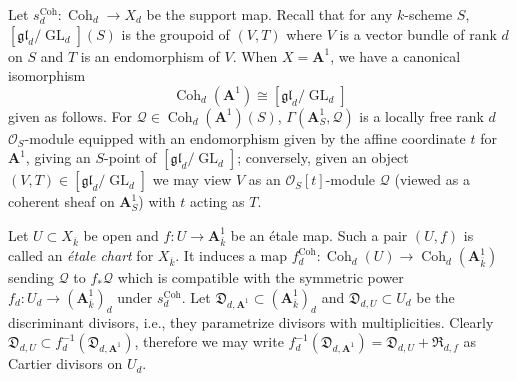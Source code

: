 \documentclass[reqno]{amsart}
\numberwithin{equation}{section}
\newcommand{\A}{\mathbf{A}}
\DeclareMathOperator{\GL}{GL}
\DeclareMathOperator{\Coh}{Coh}
\newcommand{\ov}{\overline}
\newcommand\gl{\mathfrak{gl}}
\newcommand\cO{\mathcal{O}}
\newcommand\cQ{\mathcal{Q}}
\newcommand\frD{\mathfrak{D}}
\newcommand\frR{\mathfrak{R}}
\theoremstyle{remark}
\numberwithin{equation}{section}
\begin{document}
Let $s^{\Coh}_{d}: \Coh_{d}\to X_{d}$ be the support map. Recall that for any $k$-scheme $S$, $[\gl_{d}/\GL_{d}](S)$ is the groupoid of $(V, T)$ where $V$ is a vector bundle of rank $d$ on $S$ and $T$ is an endomorphism of $V$. When $X=\A^{1}$, we have a canonical isomorphism
\begin{equation*}
\Coh_{d}(\A^{1})\cong [\gl_{d}/\GL_{d}]
\end{equation*}
given as follows. For $\cQ\in \Coh_{d}(\A^{1})(S)$, $\Gamma(\A^{1}_{S},\cQ)$ is a locally free rank $d$ $\cO_{S}$-module equipped with an endomorphism given by the affine coordinate $t$ for $\A^{1}$, giving an $S$-point of $[\gl_{d}/\GL_{d}]$; conversely, given an object $(V,T) \in [\gl_{d}/\GL_{d}]$ we may view $V$ as an $\cO_{S}[t]$-module $\cQ$ (viewed as a coherent sheaf on $\A^{1}_{S}$) with $t$ acting as $T$.  

Let $U\subset X_{\ov k}$ be open and $f:U\to \A^{1}_{\ov k}$ be an \'etale map. Such a pair $(U,f)$ is called an {\em \'etale chart} for $X_{\ov k}$. It induces a map $f^{\Coh}_{d}: \Coh_{d}(U)\to \Coh_{d}(\A^{1}_{\ov k})$ sending $\cQ$ to $f_{*}\cQ$ which is compatible with the symmetric power $f_{d}: U_{d}\to (\A^{1}_{\ov k})_{d}$ under $s^{\Coh}_{d}$. Let $\frD_{d,\A^{1}}\subset (\A^{1}_{\ov k})_{d}$ and $\frD_{d,U}\subset U_{d}$  be the discriminant divisors, i.e., they parametrize divisors with  multiplicities.  Clearly $\frD_{d,U}\subset f^{-1}_{d}(\frD_{d,\A^{1}})$, therefore we may write $f^{-1}_{d}(\frD_{d,\A^{1}})=\frD_{d,U}+\frR_{d,f}$ as Cartier divisors on $U_{d}$.  
\end{document}
